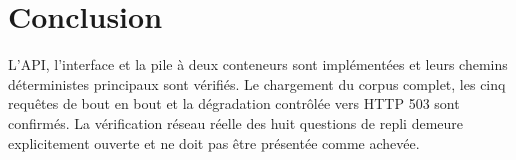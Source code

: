 \section*{Conclusion}

L'API, l'interface et la pile à deux conteneurs sont implémentées et leurs chemins
déterministes principaux sont vérifiés. Le chargement du corpus complet, les cinq
requêtes de bout en bout et la dégradation contrôlée vers HTTP 503 sont confirmés.
La vérification réseau réelle des huit questions de repli demeure explicitement
ouverte et ne doit pas être présentée comme achevée.

